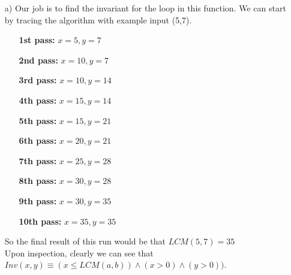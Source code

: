 \documentclass[12pt]{article}
\begin{document}
\begin{itemize}
    \item[a)] Our job is to find the invariant for the loop in this function. We can start by tracing the algorithm with example input (5,7).
    \begin{itemize}
        \item[\textbf{1st pass:}] $x=5,y=7$
        \item[\textbf{2nd pass:}] $x=10,y=7$
        \item[\textbf{3rd pass:}] $x=10,y=14$
        \item[\textbf{4th pass:}] $x=15,y=14$
        \item[\textbf{5th pass:}] $x=15,y=21$
        \item[\textbf{6th pass:}] $x=20,y=21$
        \item[\textbf{7th pass:}] $x=25,y=28$
        \item[\textbf{8th pass:}] $x=30,y=28$
        \item[\textbf{9th pass:}] $x=30,y=35$
        \item[\textbf{10th pass:}] $x=35,y=35$
    \end{itemize}
    So the final result of this run would be that $LCM(5,7)=35$\\

    Upon inspection, clearly we can see that $Inv(x,y)\equiv(x\leq LCM(a,b))\land (x>0)\land (y>0))$.

\end{itemize}
\end{document}
